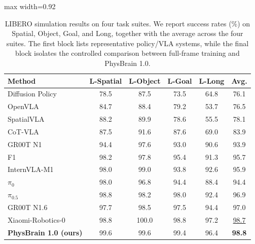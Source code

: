 \documentclass{llmxive}
\providecommand{\arraystretch}{1.3}
\begin{document}
\begin{table}[!t]
    \centering
    \setlength{\tabcolsep}{15pt}
    \renewcommand{\arraystretch}{1}
    \begin{adjustbox}{max width=0.92\linewidth}
    \begin{tabular}{lccccc}
        \toprule
        \textbf{Method} & \textbf{L-Spatial} & \textbf{L-Object} & \textbf{L-Goal} & \textbf{L-Long} & \textbf{Avg.} \\
        \midrule
        Diffusion Policy~\citep{DiffusionPolicy_23} & 78.5 & 87.5 & 73.5 & 64.8 & 76.1 \\
        OpenVLA~\citep{OpenVLA_2024_CoRL}          & 84.7 & 88.4 & 79.2 & 53.7 & 76.5 \\
        SpatialVLA~\citep{Spatialvla_2025_arXiv}       & 88.2 & 89.9 & 78.6 & 55.5 & 78.1 \\
        CoT-VLA~\citep{CoT-VLA}          & 87.5 & 91.6 & 87.6 & 69.0 & 83.9 \\
        GR00T N1~\citep{GR00T_2025_arXiv}         & 94.4 & 97.6 & 93.0 & 90.6 & 93.9 \\
        F1~\citep{F1-VLA_2025_arXiv}               & 98.2 & 97.8 & 95.4 & 91.3 & 95.7 \\
        InternVLA-M1~\citep{InternVLA_M1_25}     & 98.0 & 99.0 & 93.8 & 92.6 & 95.9 \\
        $\pi_0$~\citep{PI0_2024_arXiv}          & 98.0 & 96.8 & 94.4 & 88.4 & 94.4 \\
        $\pi_{0.5}$~\citep{PI05_2025_arXiv}      & 98.8 & 98.2 & 98.0 & 92.4 & 96.9 \\
        GR00T N1.6~\citep{GR00T_N1.6}       & 97.7 & 98.5 & 97.5 & 94.4 & 97.0 \\
        Xiaomi-Robotics-0~\citep{XiaomiRobotics0_2026_arxiv} & 98.8 & 100.0 & 98.8 & 97.2 & \underline{98.7} \\
        \midrule
        \rowcolor{gray!30}\textbf{PhysBrain 1.0 (ours)} & 99.6 & 99.6 & 99.4 & 96.4 & \textbf{98.8} \\
        \bottomrule
    \end{tabular}
    \end{adjustbox}
    \label{tab:libero_results}
\caption{
    LIBERO simulation results on four task suites.
    We report success rates (\%) on Spatial, Object, Goal, and Long, together with the average across the four suites.
    The first block lists representative policy/VLA systems, while the final block isolates the controlled comparison between full-frame training and PhysBrain 1.0.
    }
\end{table}
\end{document}
